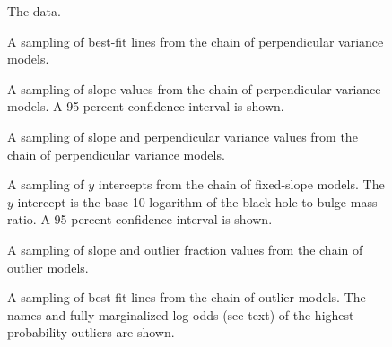 \documentclass[12pt,preprint]{aastex}
\begin{document}
\clearpage
\begin{figure}
\caption{The data.}
\end{figure}

\clearpage
\begin{figure}
\caption{A sampling of best-fit lines from the chain of perpendicular
  variance models.}
\end{figure}

\clearpage
\begin{figure}
\caption{A sampling of slope values from the chain of perpendicular
  variance models.  A 95-percent confidence interval is shown.}
\end{figure}

\clearpage
\begin{figure}
\caption{A sampling of slope and perpendicular variance values from
  the chain of perpendicular variance models.}
\end{figure}

\clearpage
\begin{figure}
\caption{A sampling of $y$ intercepts from the chain of fixed-slope
  models.  The $y$ intercept is the base-10 logarithm of the black
  hole to bulge mass ratio.  A 95-percent confidence interval is
  shown.}
\end{figure}

\clearpage
\begin{figure}
\caption{A sampling of slope and outlier fraction values from the
  chain of outlier models.}
\end{figure}

\clearpage
\begin{figure}
\caption{A sampling of best-fit lines from the chain of outlier
  models.  The names and fully marginalized log-odds (see text) of the
  highest-probability outliers are shown.}
\end{figure}
\end{document}
